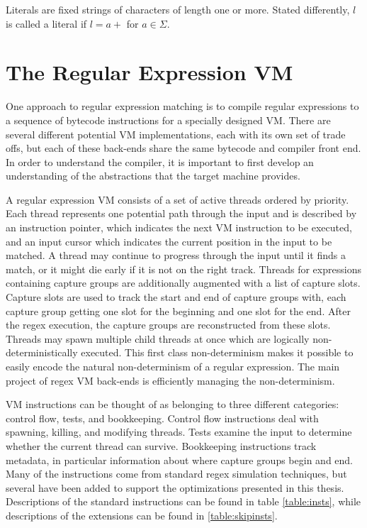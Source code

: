 Literals are fixed strings of characters of length one or more.
Stated differently, $l$ is called a literal if $l = a+$ for $a \in \Sigma$.

\section{The Regular Expression VM}
\label{section:vm}

One approach to regular expression matching is to compile regular expressions
to a sequence of bytecode instructions for a specially designed VM. There
are several different potential VM implementations, each with its own
set of trade offs, but each of these back-ends share the same bytecode
and compiler front end. In order to understand the compiler, it
is important to first develop an understanding of the abstractions
that the target machine provides.

A regular expression VM consists of a set of active threads
ordered by priority. Each thread represents one potential
path through the input and is described by an instruction
pointer, which indicates the next VM instruction to be
executed, and an input cursor which indicates the current
position in the input to be matched. A thread may continue
to progress through the input until it finds a match, or
it might die early if it is not on the right track. Threads for
expressions containing capture groups are additionally augmented with
a list of capture slots. Capture slots are used to
track the start and end of capture groups with, each capture
group getting one slot for the beginning and one slot for the
end. After the regex execution, the capture groups
are reconstructed from these slots.  Threads may spawn multiple child
threads at once which are logically non-deterministically executed.
This first class non-determinism makes it possible to easily encode
the natural non-determinism of a regular expression. The main
project of regex VM back-ends is efficiently managing the non-determinism.

VM instructions can be thought of as belonging to three different categories:
control flow, tests, and bookkeeping. Control flow instructions deal with
spawning, killing, and modifying threads. Tests examine the input to determine
whether the current thread can survive. Bookkeeping instructions track metadata,
in particular information about where capture groups begin and end.
Many of the instructions come from standard regex simulation
techniques, but several have been added to support the optimizations
presented in this thesis. Descriptions of the standard instructions 
can be found in table \ref{table:insts}, while descriptions of the
extensions can be found in \ref{table:skipinsts}.

